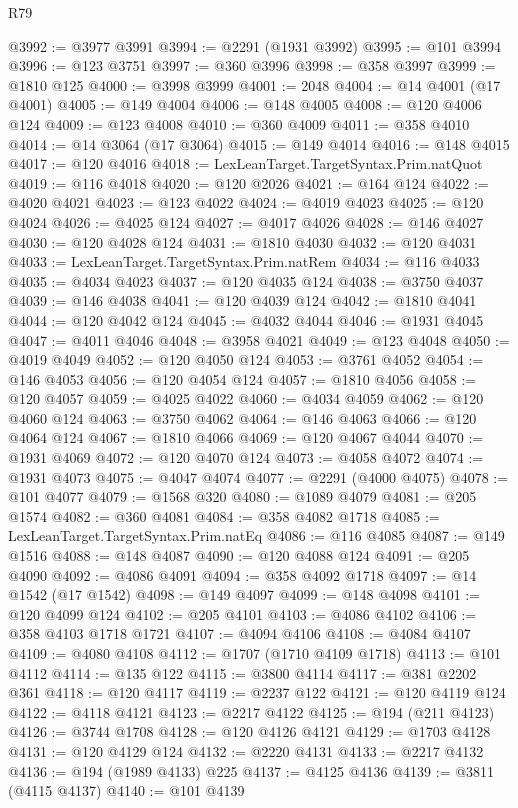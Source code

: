 \begin{lexlean}{R79}
\begin{coremodule}
@3992 := @3977 @3991
@3994 := @2291 (@1931 @3992)
@3995 := @101 @3994
@3996 := @123 @3751
@3997 := @360 @3996
@3998 := @358 @3997
@3999 := @1810 @125
@4000 := @3998 @3999
@4001 := 2048
@4004 := @14 @4001 (@17 @4001)
@4005 := @149 @4004
@4006 := @148 @4005
@4008 := @120 @4006 @124
@4009 := @123 @4008
@4010 := @360 @4009
@4011 := @358 @4010
@4014 := @14 @3064 (@17 @3064)
@4015 := @149 @4014
@4016 := @148 @4015
@4017 := @120 @4016
@4018 := LexLeanTarget.TargetSyntax.Prim.natQuot
@4019 := @116 @4018
@4020 := @120 @2026
@4021 := @164 @124
@4022 := @4020 @4021
@4023 := @123 @4022
@4024 := @4019 @4023
@4025 := @120 @4024
@4026 := @4025 @124
@4027 := @4017 @4026
@4028 := @146 @4027
@4030 := @120 @4028 @124
@4031 := @1810 @4030
@4032 := @120 @4031
@4033 := LexLeanTarget.TargetSyntax.Prim.natRem
@4034 := @116 @4033
@4035 := @4034 @4023
@4037 := @120 @4035 @124
@4038 := @3750 @4037
@4039 := @146 @4038
@4041 := @120 @4039 @124
@4042 := @1810 @4041
@4044 := @120 @4042 @124
@4045 := @4032 @4044
@4046 := @1931 @4045
@4047 := @4011 @4046
@4048 := @3958 @4021
@4049 := @123 @4048
@4050 := @4019 @4049
@4052 := @120 @4050 @124
@4053 := @3761 @4052
@4054 := @146 @4053
@4056 := @120 @4054 @124
@4057 := @1810 @4056
@4058 := @120 @4057
@4059 := @4025 @4022
@4060 := @4034 @4059
@4062 := @120 @4060 @124
@4063 := @3750 @4062
@4064 := @146 @4063
@4066 := @120 @4064 @124
@4067 := @1810 @4066
@4069 := @120 @4067 @4044
@4070 := @1931 @4069
@4072 := @120 @4070 @124
@4073 := @4058 @4072
@4074 := @1931 @4073
@4075 := @4047 @4074
@4077 := @2291 (@4000 @4075)
@4078 := @101 @4077
@4079 := @1568 @320
@4080 := @1089 @4079
@4081 := @205 @1574
@4082 := @360 @4081
@4084 := @358 @4082 @1718
@4085 := LexLeanTarget.TargetSyntax.Prim.natEq
@4086 := @116 @4085
@4087 := @149 @1516
@4088 := @148 @4087
@4090 := @120 @4088 @124
@4091 := @205 @4090
@4092 := @4086 @4091
@4094 := @358 @4092 @1718
@4097 := @14 @1542 (@17 @1542)
@4098 := @149 @4097
@4099 := @148 @4098
@4101 := @120 @4099 @124
@4102 := @205 @4101
@4103 := @4086 @4102
@4106 := @358 @4103 @1718 @1721
@4107 := @4094 @4106
@4108 := @4084 @4107
@4109 := @4080 @4108
@4112 := @1707 (@1710 @4109 @1718)
@4113 := @101 @4112
@4114 := @135 @122
@4115 := @3800 @4114
@4117 := @381 @2202 @361
@4118 := @120 @4117
@4119 := @2237 @122
@4121 := @120 @4119 @124
@4122 := @4118 @4121
@4123 := @2217 @4122
@4125 := @194 (@211 @4123)
@4126 := @3744 @1708
@4128 := @120 @4126 @4121
@4129 := @1703 @4128
@4131 := @120 @4129 @124
@4132 := @2220 @4131
@4133 := @2217 @4132
@4136 := @194 (@1989 @4133) @225
@4137 := @4125 @4136
@4139 := @3811 (@4115 @4137)
@4140 := @101 @4139

\end{coremodule}
\end{lexlean}
